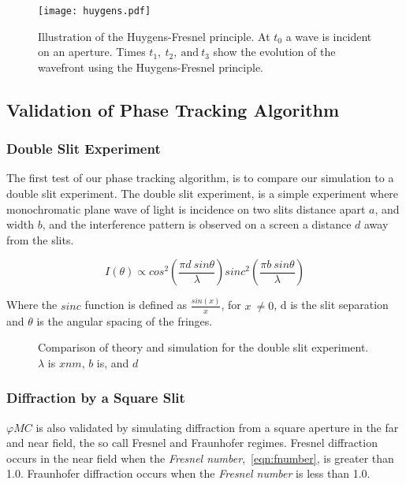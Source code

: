 %

\begin{figure}[!ht]
    \centering
    \texttt{[image: huygens.pdf]}
    \caption{Illustration of the Huygens-Fresnel principle. At $t_0$ a wave is incident on an aperture. Times $t_1,\ t_2,\ \text{and}\ t_3$ show the evolution of the wavefront using the Huygens-Fresnel principle.}
    \label{fig:huygensillis}
\end{figure}

\subsection{Validation of Phase Tracking Algorithm}

\subsubsection*{Double Slit Experiment}

The first test of our phase tracking algorithm, is to compare our simulation to a double slit experiment.
The double slit experiment, is a simple experiment where monochromatic plane wave of light is incidence on two slits distance apart $a$, and width $b$, and the interference pattern is observed on a screen a distance $d$ away from the slits.


\begin{equation}
    I(\theta) \propto cos^2\left(\frac{\pi d\ sin \theta}{\lambda}\right)sinc^2\left(\frac{\pi b\ sin\theta}{\lambda}\right)
\end{equation}

Where the $sinc$ function is defined as $\tfrac{sin(x)}{x}$, for $x\ \neq 0$, d is the slit separation and $\theta$ is the angular spacing of the fringes.


\begin{figure}[!ht]
    \centering
    \caption{Comparison of theory and simulation for the double slit experiment. $\lambda$ is $x nm$, $b$ is, and $d$}
    \label{fig:doubleslitcomp}
\end{figure}

\subsubsection*{Diffraction by a Square Slit}
$\varphi MC$ is also validated by simulating diffraction from a square aperture in the far and near field, the so call Fresnel and Fraunhofer regimes. 
Fresnel diffraction occurs in the near field when the \textit{Fresnel number},~\cref{eqn:fnumber}, is greater than 1.0.
Fraunhofer diffraction occurs when the \textit{Fresnel number} is less than 1.0.

